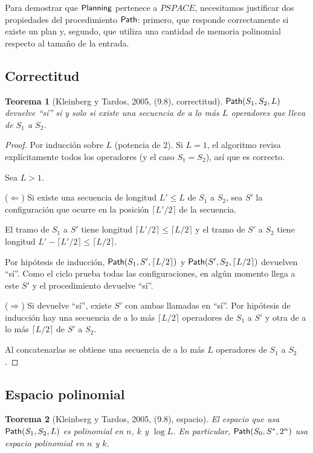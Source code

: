 \documentclass[11pt,letterpaper]{article}
\theoremstyle{plain}
\newtheorem{teorema}{Teorema}[section]
\theoremstyle{definition}
\theoremstyle{remark}
\newcommand{\nombreMat}[1]{\ensuremath{\text{\fontencoding{OT1}\fontfamily{cmss}\upshape\selectfont #1}}}
\newcommand{\PSPACE}{\nombreMat{PSPACE}}
\newcommand{\NP}{\nombreMat{NP}}
\newcommand{\coNP}{\nombreMat{co-NP}}
\newcommand{\PLANNING}{\nombreMat{Planning}}
\newcommand{\Path}{\nombreMat{Path}}
\def\PSPACE{PSPACE}\def\NP{NP}\def\coNP{co-NP}%
\begin{document}
Para demostrar que \PLANNING{} pertenece a $\PSPACE$,
necesitamos justificar dos propiedades del procedimiento
\Path: primero, que responde correctamente si existe
un plan y, segundo, que utiliza una cantidad de
memoria polinomial respecto al tamaño de la entrada.


\subsection{Correctitud}

\begin{teorema}[Kleinberg y Tardos, 2005, (9.8), correctitud]
\label{teo:98c}
$\Path(S_1,S_2,L)$ devuelve ``sí'' si y solo si
existe una secuencia de a lo más $L$ operadores
que lleva de $S_1$ a $S_2$.
\end{teorema}

\begin{proof}
Por inducción sobre $L$ (potencia de $2$).
Si $L=1$, el algoritmo revisa explícitamente
todos los operadores (y el caso $S_1=S_2$),
así que es correcto.

Sea $L>1$.

($\Leftarrow$)
Si existe una secuencia de longitud $L'\le L$
de $S_1$ a $S_2$, sea $S'$ la configuración que
ocurre en la posición $\lceil L'/2\rceil$
de la secuencia.

El tramo de $S_1$ a $S'$ tiene longitud
$\lceil L'/2\rceil\le\lceil L/2\rceil$
y el tramo de $S'$ a $S_2$ tiene longitud
$L'-\lceil L'/2\rceil\le\lceil L/2\rceil$.

Por hipótesis de inducción,
$\Path(S_1,S',\lceil L/2\rceil)$ y
$\Path(S',S_2,\lceil L/2\rceil)$ devuelven
``sí''. Como el ciclo prueba todas las
configuraciones, en algún momento llega a
este $S'$ y el procedimiento devuelve ``sí''.

($\Rightarrow$)
Si devuelve ``sí'', existe $S'$ con ambas
llamadas en ``sí''. Por hipótesis de inducción
hay una secuencia de a lo más $\lceil L/2\rceil$
operadores de $S_1$ a $S'$ y otra de a lo más
$\lceil L/2\rceil$ de $S'$ a $S_2$.

Al concatenarlas se obtiene una secuencia
de a lo más $L$ operadores de $S_1$ a $S_2$.
\end{proof}

\subsection{Espacio polinomial}

\begin{teorema}[Kleinberg y Tardos, 2005, (9.8), espacio]
\label{teo:98e}
El espacio que usa $\Path(S_1,S_2,L)$ es polinomial
en $n$, $k$ y $\log L$. En particular,
$\Path(S_0,S^{*},2^{n})$ usa espacio polinomial
en $n$ y $k$.
\end{teorema}
\end{document}
